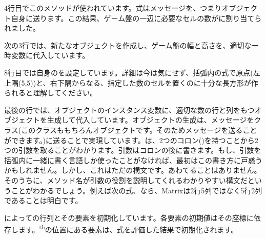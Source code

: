 \documentclass[a4paper,10pt,twoside]{book}
\begin{document}
4行目でこのメソッドが使われています。\st 式はメッセージを、つまりオブジェクト自身に送ります。この結果、ゲーム盤の一辺に必要なセルの数がに割り当てられました。

次の3行では、新たなオブジェクトを作成し、ゲーム盤の幅と高さを、適切な一時変数に代入しています。

8行目では自身のを設定しています。詳細は今は気にせず、括弧内の式で原点(\ie 左上隅(5,5))と、右下隅からなる、指定した数のセルを置くのに十分な長方形が作られると理解してください。

最後の行では、オブジェクトのインスタンス変数に、適切な数の行と列をもつオブジェクトを生成して代入しています。オブジェクトの生成は、メッセージをクラス(このクラスももちろんオブジェクトです。そのためメッセージを送ることができます。)に送ることで実現しています。は、2つのコロン(\ct{:})を持つことから2つの引数を取ることがわかります。引数はコロンの後に書きます。もし、引数を括弧内に一緒に書く言語しか使ったことがなければ、最初はこの書き方に戸惑うかもしれません。しかし、これはただの構文です。あわてることはありません。そのうちに、メソッド名が引数の役割を説明してくれるわかりやすい構文だということがわかるでしょう。例えば次の式、なら、Matrixは2行5列ではなく5行2列であることは明白です。


によっての行列とその要素を初期化しています。各要素の初期値はその座標に依存します。\textsuperscript{th}の位置にある要素は、式を評価した結果で初期化されます。



\end{document}
